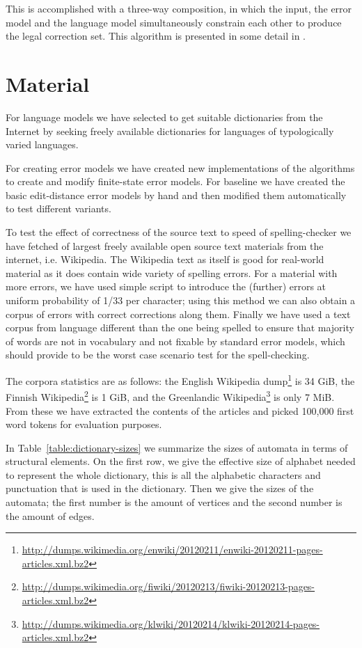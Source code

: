 \documentclass[11pt]{article}
\begin{document}
This is accomplished with a three-way composition, in which the input, the
error model and the language model simultaneously constrain each other to
produce the legal correction set. This algorithm is presented in some detail
in .

\section{Material}
\label{sec:materials}

For language models we have selected to get suitable dictionaries from the
Internet by seeking freely available dictionaries for languages of
typologically varied languages.

For creating error models we have created new implementations of the algorithms
to create and modify finite-state error models. For baseline we have created
the basic edit-distance error models by hand and then modified them
automatically to test different variants.

To test the effect of correctness of the source text to speed of
spelling-checker we have fetched of largest freely available open source text
materials from the internet, i.e. Wikipedia. The Wikipedia text as itself is
good for real-world material as it does contain wide variety of spelling
errors. For a material with more errors, we have used simple script to
introduce the (further) errors at uniform probability of 1/33 per character;
using this method we can also obtain a corpus of errors with correct
corrections along them.  Finally we have used a text corpus from language
different than the one being spelled to ensure that majority of words are not
in vocabulary and not fixable by standard error models, which should provide to
be the worst case scenario test for the spell-checking.

The corpora statistics are as follows: the English Wikipedia
dump\footnote{\url{http://dumps.wikimedia.org/enwiki/20120211/enwiki-20120211-pages-articles.xml.bz2}}
is 34 GiB, the Finnish
Wikipedia\footnote{\url{http://dumps.wikimedia.org/fiwiki/20120213/fiwiki-20120213-pages-articles.xml.bz2}}
is 1 GiB, and the Greenlandic
Wikipedia\footnote{\url{http://dumps.wikimedia.org/klwiki/20120214/klwiki-20120214-pages-articles.xml.bz2}}
is only 7 MiB. From these we have extracted the contents of the articles and
picked 100,000 first word tokens for evaluation purposes.

In Table~\ref{table:dictionary-sizes} we summarize the sizes of automata in
terms of structural elements. On the first row, we give the effective size of
alphabet needed to represent the whole dictionary, this is all the alphabetic
characters and punctuation that is used in the dictionary. Then we give the
sizes of the automata; the first number is the amount of vertices and the
second number is the amount of edges.
\end{document}
